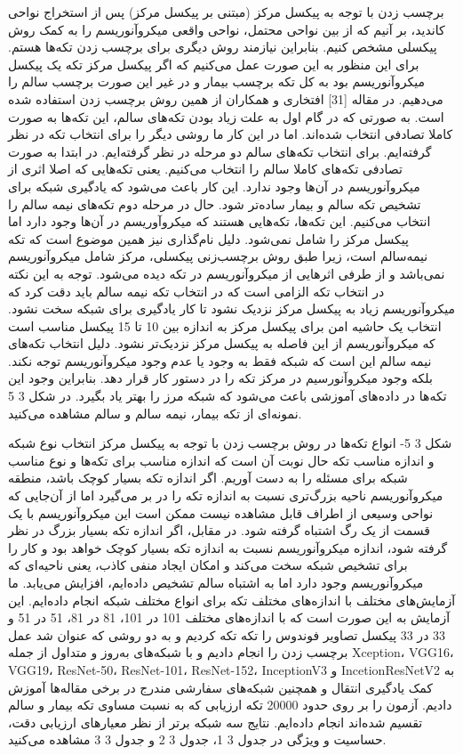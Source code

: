 برچسب زدن با توجه به پیکسل مرکز (مبتنی بر پیکسل مرکز)
پس از استخراج نواحی کاندید، بر آنیم که از بین نواحی محتمل، نواحی واقعی میکروآنوریسم را به کمک روش پیکسلی مشخص کنیم. بنابراین نیازمند روش دیگری برای برچسب زدن تکه‌ها هستم. برای این منظور به این صورت عمل می‌کنیم که اگر پیکسل مرکز تکه یک پیکسل میکروآنوریسم بود به کل تکه برچسب بیمار و در غیر این صورت برچسب سالم را می‌دهیم. در مقاله [31] افتخاری و همکاران از همین روش برچسب زدن استفاده شده است. به صورتی که در گام اول به علت زیاد بودن تکه‌های سالم، این تکه‌ها به صورت کاملا تصادفی انتخاب شده‌اند.
اما در این کار ما روشی دیگر را برای انتخاب تکه در نظر گرفته‌ایم. برای انتخاب تکه‌های سالم دو مرحله در نظر گرفته‌ایم.
در ابتدا به صورت تصادفی تکه‌های کاملا سالم را انتخاب می‌کنیم. یعنی تکه‌هایی که اصلا اثری از میکروآنوریسم در آن‌ها وجود ندارد. این کار باعث می‌شود که یادگیری شبکه برای تشخیص تکه سالم و بیمار ساده‌تر شود.
حال در مرحله دوم تکه‌های نیمه سالم را انتخاب ‌می‌کنیم. این تکه‌ها،‌ تکه‌هایی هستند که میکروآوریسم در آن‌ها وجود دارد اما پیکسل مرکز را شامل نمی‌شود. دلیل نام‌گذاری نیز همین موضوع است که تکه نیمه‌سالم است، زیرا طبق روش برچسب‌زنی پیکسلی، مرکز شامل میکروآنوریسم نمی‌باشد و از طرفی اثرهایی از میکروآنوریسم در تکه دیده می‌شود.
توجه به این نکته در انتخاب تکه الزامی است که در انتخاب تکه نیمه سالم باید دقت کرد که میکروآنوریسم زیاد به پیکسل مرکز نزدیک نشود تا کار یادگیری برای شبکه سخت نشود. انتخاب یک حاشیه امن برای پیکسل مرکز به اندازه بین 10 تا 15 پیکسل مناسب است که میکروآنوریسم از این فاصله به پیکسل مرکز نزدیک‌تر نشود.
دلیل انتخاب تکه‌های نیمه سالم این است که شبکه فقط به وجود یا عدم وجود میکروآنوریسم توجه نکند. بلکه وجود میکروآنورسیم در مرکز تکه را در دستور کار قرار دهد. بنابراین وجود این تکه‌ها در داده‌های آموزشی باعث می‌شود که شبکه مرز را بهتر یاد بگیرد. در شکل ‏3 5 نمونه‌ای از تکه بیمار، نیمه سالم و سالم مشاهده می‌کنید.

 
شکل ‏3 5- انواع تکه‌ها در روش برچسب زدن با توجه به پیکسل مرکز
انتخاب نوع شبکه و اندازه مناسب تکه
حال نوبت آن است که اندازه مناسب برای تکه‌ها و نوع مناسب شبکه برای مسئله را به دست آوریم. اگر اندازه تکه بسیار کوچک باشد، منطقه میکروآنوریسم ناحیه بزرگ‌تری نسبت به اندازه تکه را در بر می‌گیرد اما از آن‌جایی که نواحی وسیعی از اطراف قابل مشاهده نیست ممکن است این میکروآنوریسم با یک قسمت از یک رگ اشتباه گرفته شود. در مقابل، اگر اندازه تکه بسیار بزرگ در نظر گرفته شود، اندازه میکروآنوریسم نسبت به اندازه تکه بسیار کوچک خواهد بود و کار را برای تشخیص شبکه سخت می‌کند و امکان ایجاد منفی کاذب، یعنی ناحیه‌ای که میکروآنوریسم وجود دارد اما به اشتباه سالم تشخیص داده‌ایم، افزایش می‌یابد.
ما آزمایش‌های مختلف با اندازه‌های مختلف تکه برای انواع مختلف شبکه انجام داده‌ایم. این آزمایش به این صورت است که با اندازه‌های مختلف 101 در 101، 81 در 81، 51 در 51 و 33 در 33 پیکسل تصاویر فوندوس را تکه تکه کردیم و به دو روشی که عنوان شد عمل برچسب‌ زدن را انجام دادیم و با شبکه‌های به‌روز و متداول از جمله Xception، VGG16، VGG19، ResNet-50، ResNet-101، ResNet-152، InceptionV3 و IncetionResNetV2 به کمک یادگیری انتقال و همچنین شبکه‌های سفارشی مندرج در برخی مقاله‌ها آموزش دادیم. آزمون را بر روی حدود 20000 تکه ارزیابی که به نسبت مساوی تکه بیمار و سالم تقسیم شده‌اند انجام داده‌ایم. نتایج سه شبکه برتر از نظر معیار‌های ارزیابی دقت، حساسیت و ویژگی در جدول ‏3 1، جدول ‏3 2 و جدول ‏3 3 مشاهده می‌کنید. 



